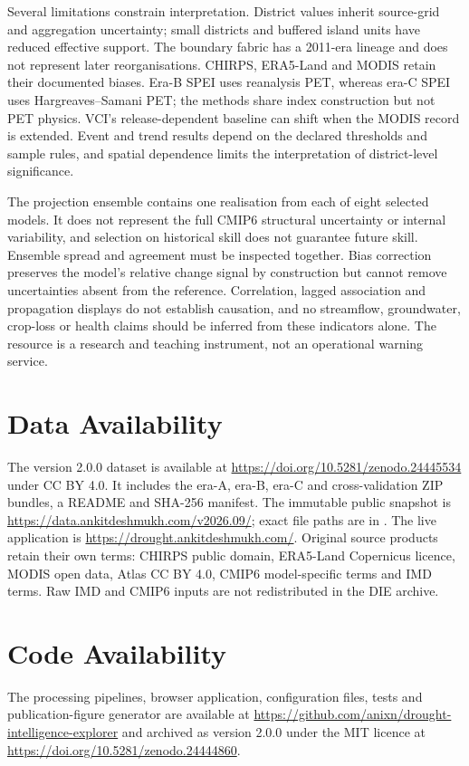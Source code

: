 \documentclass[11pt,a4paper]{article}
\begin{document}
Several limitations constrain interpretation. District values inherit source-grid and aggregation uncertainty; small districts and buffered island units have reduced effective support. The boundary fabric has a 2011-era lineage and does not represent later reorganisations. CHIRPS, ERA5-Land and MODIS retain their documented biases. Era-B SPEI uses reanalysis PET, whereas era-C SPEI uses Hargreaves--Samani PET; the methods share index construction but not PET physics. VCI's release-dependent baseline can shift when the MODIS record is extended. Event and trend results depend on the declared thresholds and sample rules, and spatial dependence limits the interpretation of district-level significance.

The projection ensemble contains one realisation from each of eight selected models. It does not represent the full CMIP6 structural uncertainty or internal variability, and selection on historical skill does not guarantee future skill. Ensemble spread and agreement must be inspected together. Bias correction preserves the model's relative change signal by construction but cannot remove uncertainties absent from the reference. Correlation, lagged association and propagation displays do not establish causation, and no streamflow, groundwater, crop-loss or health claims should be inferred from these indicators alone. The resource is a research and teaching instrument, not an operational warning service.

\section*{Data Availability}
The version 2.0.0 dataset is available at \url{https://doi.org/10.5281/zenodo.24445534}\citep{DeshmukhData2026} under CC BY 4.0. It includes the era-A, era-B, era-C and cross-validation ZIP bundles, a README and SHA-256 manifest. The immutable public snapshot is \url{https://data.ankitdeshmukh.com/v2026.09/}; exact file paths are in . The live application is \url{https://drought.ankitdeshmukh.com/}. Original source products retain their own terms: CHIRPS public domain, ERA5-Land Copernicus licence, MODIS open data, Atlas CC BY 4.0, CMIP6 model-specific terms and IMD terms. Raw IMD and CMIP6 inputs are not redistributed in the DIE archive.

\section*{Code Availability}
The processing pipelines, browser application, configuration files, tests and publication-figure generator are available at \url{https://github.com/anixn/drought-intelligence-explorer} and archived as version 2.0.0 under the MIT licence at \url{https://doi.org/10.5281/zenodo.24444860}\citep{DeshmukhSoftware2026}.
\end{document}
